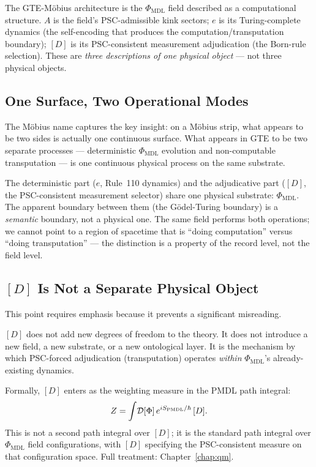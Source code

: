 \documentclass[11pt,openany]{book}
\theoremstyle{remark}
\newcommand{\PHIMDL}{\Phi_{\mathrm{MDL}}}
\begin{document}
\begin{tcolorbox}[colback=green!5,colframe=green!50!black,
  title={Definition: GTE-Möbius Architecture $(A,e,[D])$}]
The GTE-Möbius architecture is the $\PHIMDL$ field described as a computational
structure.
$A$ is the field's PSC-admissible kink sectors;
$e$ is its Turing-complete dynamics (the self-encoding that produces the computation/transputation
boundary);
$[D]$ is its PSC-consistent measurement adjudication (the Born-rule selection).
These are \emph{three descriptions of one physical object} --- not three physical objects.
\end{tcolorbox}

\subsection*{One Surface, Two Operational Modes}

The Möbius name captures the key insight: on a Möbius strip, what appears to be two
sides is actually one continuous surface.
What appears in GTE to be two separate processes --- deterministic $\PHIMDL$ evolution
and non-computable transputation --- is one continuous physical process on the same substrate.

The deterministic part ($e$, Rule~110 dynamics) and the adjudicative part ($[D]$, the
PSC-consistent measurement selector) share one physical substrate: $\PHIMDL$.
The apparent boundary between them (the Gödel-Turing boundary) is a \emph{semantic}
boundary, not a physical one.
The same field performs both operations; we cannot point to a region of spacetime
that is ``doing computation'' versus ``doing transputation'' --- the distinction is
a property of the record level, not the field level.

\subsection*{$[D]$ Is Not a Separate Physical Object}

This point requires emphasis because it prevents a significant misreading.

$[D]$ does not add new degrees of freedom to the theory.
It does not introduce a new field, a new substrate, or a new ontological layer.
It is the mechanism by which PSC-forced adjudication (transputation) operates
\emph{within} $\PHIMDL$'s already-existing dynamics.

Formally, $[D]$ enters as the weighting measure in the PMDL path integral:
\[
Z = \int\!\mathcal{D}[\Phi]\,e^{iS_{\rm PMDL}/\hbar}\,[D].
\]
This is not a second path integral over $[D]$; it is the standard path integral over
$\PHIMDL$ field configurations, with $[D]$ specifying the PSC-consistent measure on
that configuration space.
Full treatment: Chapter~\ref{chap:qm}.
\end{document}
